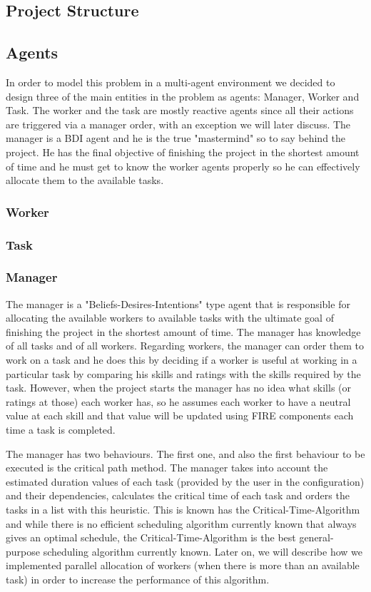 \documentclass[paper=a4, fontsize=11pt]{scrartcl} %
\numberwithin{equation}{section} %
\numberwithin{figure}{section} %
\numberwithin{table}{section} %
\begin{document}
\subsection{Project Structure}

\subsection{Agents}
In order to model this problem in a multi-agent environment we decided to design three of the main entities in the problem as agents: Manager, Worker and Task. The worker and the task are mostly reactive agents since all their actions are triggered via a manager order, with an exception we will later discuss. The manager is a BDI agent and he is the true "mastermind" so to say behind the project. He has the final objective of finishing the project in the shortest amount of time and he must get to know the worker agents properly so he can effectively allocate them to the available tasks.

\subsubsection{Worker}

\subsubsection{Task}

\subsubsection{Manager}
The manager is a "Beliefs-Desires-Intentions" type agent that is responsible for allocating the available workers to available tasks with the ultimate goal of finishing the project in the shortest amount of time. The manager has knowledge of all tasks and of all workers. Regarding workers, the manager can order them to work on a task and he does this by deciding if a worker is useful at working in a particular task by comparing his skills and ratings with the skills required by the task. However, when the project starts the manager has no idea what skills (or ratings at those) each worker has, so he assumes each worker to have a neutral value at each skill and that value will be updated using FIRE components each time a task is completed.

The manager has two behaviours. The first one, and also the first behaviour to be executed is the critical path method. The manager takes into account the estimated duration values of each task (provided by the user in the configuration) and their dependencies, calculates the critical time of each task and orders the tasks in a list with this heuristic. This is known has the Critical-Time-Algorithm and while there is no efficient scheduling algorithm currently known that always gives an optimal schedule, the Critical-Time-Algorithm is the best general-purpose scheduling algorithm currently known. Later on, we will describe how we implemented parallel allocation of workers (when there is more than an available task) in order to increase the performance of this algorithm.
\end{document}
